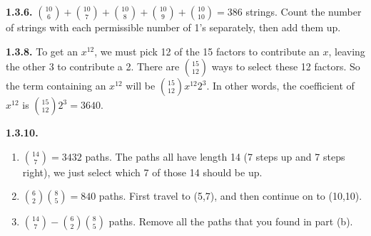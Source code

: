 \documentclass[12pt,]{book}
\theoremstyle{plain}
\theoremstyle{definition}
\theoremstyle{definition}
\theoremstyle{definition}
\numberwithin{equation}{chapter}
\begin{document}
%
\par\smallskip
\noindent\textbf{1.3.6.} \hypertarget{p-894}{}%
\({10 \choose 6} + {10\choose 7} + {10\choose 8} + {10 \choose 9} + {10\choose 10} = 386\) strings.  Count the number of strings with each permissible number of 1's separately, then add them up.%
\par\smallskip
\noindent\textbf{1.3.8.} \hypertarget{p-898}{}%
To get an \(x^{12}\), we must pick 12 of the 15 factors to contribute an \(x\), leaving the other 3 to contribute a 2. There are \({15 \choose 12}\) ways to select these 12 factors. So the term containing an \(x^{12}\) will be \({15 \choose 12}x^{12}2^{3}\). In other words, the coefficient of \(x^{12}\) is \({15\choose 12}2^3 = 3640\).%
\par\smallskip
\noindent\textbf{1.3.10.} \hypertarget{p-904}{}%
\leavevmode%
\begin{enumerate}[label=(\alph*)]
\item\hypertarget{li-423}{}\({14 \choose 7} = 3432\) paths.  The paths all have length 14 (7 steps up and 7 steps right), we just select which 7 of those 14 should be up.%
\item\hypertarget{li-424}{}\({6 \choose 2}{8\choose 5} = 840\) paths.  First travel to (5,7), and then continue on to (10,10).%
\item\hypertarget{li-425}{}\({14 \choose 7} - {6\choose 2}{8 \choose 5}\) paths.  Remove all the paths that you found in part (b).%
\end{enumerate}
%
\par\smallskip
\end{document}
